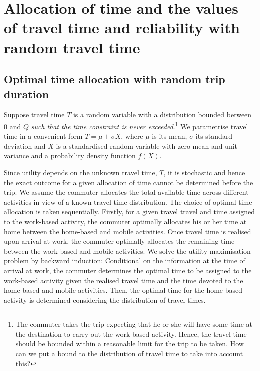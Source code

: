 \documentclass[12pt,a4paper,british]{article}
\begin{document}



\section{Allocation of time and the values of travel time and reliability with random travel time }

\subsection*{Optimal time allocation with random trip duration}

Suppose travel time $T$ is a random variable with a distribution bounded between $0$ and $Q$ \textit{such that the time constraint is never exceeded}.\footnote{The commuter takes the trip expecting that he or she will have some time at the destination to carry out the work-based activity. Hence, the travel time should be bounded within a reasonable limit for the trip to be taken. How can we put a bound to the distribution of travel time to take into account this?} We parametrise travel time in a convenient form $T=\mu+\sigma X$, where $\mu$ is its mean, $\sigma$ its standard deviation and $X$ is a standardised random variable with zero mean and unit variance and a probability density function $f\left(X\right)$. 

Since utility depends on the unknown travel time, $T$, it is stochastic and hence the exact outcome for a given allocation of time cannot be determined before the trip. We assume the commuter allocates the total available time across different activities in view of a known travel time distribution. The choice of optimal time allocation is taken sequentially. Firstly, for a given travel travel and time assigned to the work-based activity, the commuter optimally allocates his or her time at home between the home-based and mobile activities. Once travel time is realised upon arrival at work, the commuter optimally allocates the remaining time between the work-based and mobile activities. We solve the utility maximisation problem by backward induction: Conditional on the information at the time of arrival at work, the commuter determines the optimal time to be assigned to the work-based activity given the realised travel time and the time devoted to the home-based and mobile activities. Then, the optimal time for the home-based activity is determined considering the distribution of travel times.
\end{document}
